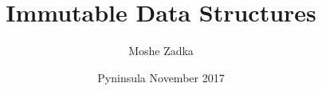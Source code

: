 \documentclass{beamer}
\title{Immutable Data Structures}
\author{Moshe Zadka}
\date{Pyninsula November 2017}
\begin{document}
 
\frame{\titlepage}
\end{document}
